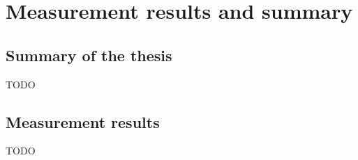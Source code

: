 \chapter{Measurement results and summary}
\label{sec:Summary}

\section{Summary of the thesis}
TODO

\section{Measurement results}
TODO
